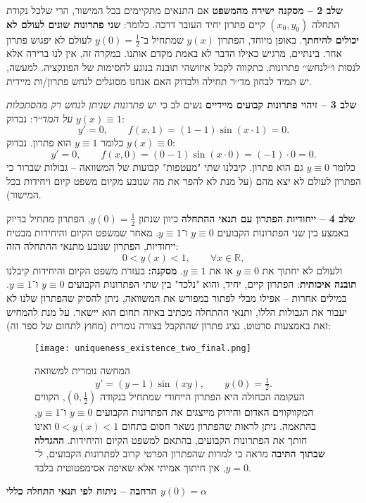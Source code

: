\documentclass{article}
\numberwithin{equation}{section}
\begin{document}
\textbf{שלב 2 – מסקנה ישירה מהמשפט} אם התנאים מתקיימים בכל המישור, הרי שלכל נקודת התחלה $(x_0,y_0)$ קיים פתרון יחיד העובר דרכה. כלומר: \textbf{שני פתרונות שונים לעולם לא יכולים להיחתך}. באופן מיוחד, הפתרון $y(x)$ שמתחיל ב־$y(0)=\tfrac{1}{2}$ לעולם לא יפגוש פתרון אחר. בינתיים, מרגיש כאילו הדבר לא באמת מקדם אותנו. במקרה זה, אין לנו ברירה אלא לנסות ו׳׳לנחש׳׳ פתרונות, בתקווה לקבל איזושהי תובנה בנוגע לחסימות של הפונקציה. למעשה, יש תמיד לבחון מד׳׳ר תחילה ולבדוק האם אנחנו מסוגלים לנחש פתרון/ות מיידית. 

\textbf{שלב 3 – זיהוי פתרונות קבועים מיידיים} נשים לב כי יש \emph{פתרונות שניתן לנחש רק מהסתכלות על המד׳׳ר}: נבדוק $y(x)\equiv 1$: \[ y' = 0, \qquad f(x,1) = (1-1)\sin(x\cdot 1) = 0. \] כלומר $y\equiv 1$ הוא פתרון. נבדוק $y(x)\equiv 0$: \[ y' = 0, \qquad f(x,0) = (0-1)\sin(x\cdot 0) = (-1)\cdot 0 = 0. \] כלומר $y\equiv 0$ גם הוא פתרון. קיבלנו שתי "מעטפות" קבועות של המשוואה – גבולות שברור כי הפתרון לעולם לא יצא מהם (על מנת לא להפר את מה שנובע מקיום משפט קיום ויחידות בכל המישור). 

\textbf{שלב 4 – ייחודיות הפתרון עם תנאי ההתחלה} כיוון שנתון $y(0)=\tfrac{1}{2}$, הפתרון מתחיל בדיוק באמצע בין שני הפתרונות הקבועים $y\equiv 0$ ו־$y\equiv 1$. מאחר שמשפט הקיום והיחידות מבטיח ייחודיות, הפתרון שנובע מתנאי ההתחלה הזה: \[ 0 < y(x) < 1, \qquad \forall x \in \mathbb{R}, \] ולעולם לא יחתוך את $y\equiv 0$ או את $y\equiv 1$. \textbf{מסקנה:} בעזרת משפט הקיום והיחידות קיבלנו \textbf{תובנה איכותית}: הפתרון קיים, יחיד, והוא "נלכד" בין שתי הפתרונות הקבועים $y\equiv 0$ ו־$y\equiv 1$. במילים אחרות – אפילו מבלי לפתור במפורש את המשוואה, ניתן להסיק שהפתרון שלנו לא יעבור את הגבולות הללו, ותנאי ההתחלה מכתיב באיזה תחום הוא יישאר. על מנת להמחיש זאת באמצעות סרטוט, נציג פתרון שהתקבל בצורה נומרית (מחוץ לתחום של ספר זה): \begin{figure}[H] \centering \texttt{[image: uniqueness\_existence\_two\_final.png]} \caption{המחשה נומרית למשוואה \[ y' = (y-1)\sin(xy), \qquad y(0)=\tfrac{1}{2}. \] העקומה הכחולה היא הפתרון הייחודי שמתחיל בנקודה $(0,\tfrac{1}{2})$, הקווים המקווקווים האדום והירוק מייצגים את הפתרונות הקבועים $y\equiv 0$ ו־$y\equiv 1$, בהתאמה. ניתן לראות שהפתרון נשאר חסום בתחום $0<y(x)<1$ ואינו חותך את הפתרונות הקבועים, בהתאם למשפט הקיום והיחידות. \textbf{ההגדלה שבתוך התיבה} מראה כי למרות שהפתרון הפרטי קרוב לפתרונות הקבועים, ל־$y=0$, אין חיתוך אמיתי אלא שאיפה אסימפטוטית בלבד.} \label{fig:uniqueness_existence_demo} \end{figure}



\textbf{הרחבה – ניתוח לפי תנאי התחלה כללי $y(0)=\alpha$}  
\end{document}
